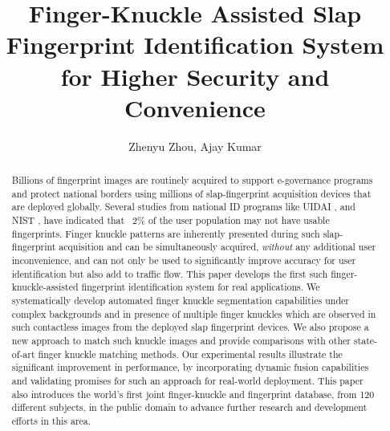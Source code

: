 \documentclass[a4paper, 12pt]{article}
\begin{document}
\title{Finger-Knuckle Assisted Slap Fingerprint Identification System for Higher Security and Convenience}

\author{Zhenyu Zhou, Ajay Kumar}
\date{}



\maketitle

\begin{abstract}
  Billions of fingerprint images are routinely acquired to support e-governance programs and protect national borders using millions of slap-fingerprint acquisition devices that are deployed globally. Several studies from national ID programs like UIDAI \cite{uidai}, and NIST \cite{2002SUMMARYON}, have indicated that ~2\% of the user population may not have usable fingerprints. Finger knuckle patterns are inherently presented during such slap-fingerprint acquisition and can be simultaneously acquired, \textit{without} any additional user inconvenience, and can not only be used to significantly improve accuracy for user identification but also add to traffic flow. This paper develops the first such finger-knuckle-assisted fingerprint identification system for real applications. We systematically develop automated finger knuckle segmentation capabilities under complex backgrounds and in presence of multiple finger knuckles which are observed in such contactless images from the deployed slap fingerprint devices. We also propose a new approach to match such knuckle images and provide comparisons with other state-of-art finger knuckle matching methods. Our experimental results illustrate the significant improvement in performance, by incorporating dynamic fusion capabilities and validating promises for such an approach for real-world deployment. This paper also introduces the world’s first joint finger-knuckle and fingerprint database, from 120 different subjects, in the public domain to advance further research and development efforts in this area.

\end{abstract}
\end{document}
